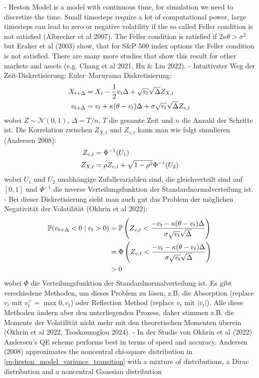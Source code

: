 - Heston Model is a model with continuous time, for simulation we need to discretize the time. Small timesteps require a lot of computational power, large timesteps can lead to zero or negative volatility if the so called Feller condition is not satisfied (Albrecher et al 2007). The Feller condition is satisfied if $2\kappa\theta > \sigma^2$ but Eraker et al (2003) show, that for S&P 500 index options the Feller condition is not satisfied. There are many more studies that show this result for other markets and assets (e.g. Chang et al 2021, Hu & Liu 2022).
- Intuitivster Weg der Zeit-Diskretisierung: Euler–Maruyama Diskretisierung:
\begin{align}
    X_{t+\Delta} &= X_t - \frac{1}{2}v_t\Delta + \sqrt{v_t}\sqrt{\Delta}Z_{X,t} \notag \\
    v_{t+\Delta} &= v_t + \kappa(\theta - v_t)\Delta + \sigma\sqrt{v_t}\sqrt{\Delta}Z_{v,t} \notag
\end{align}
wobei $Z\sim\mathcal{N}(0,1)$, $\Delta = T/n$, $T$ die gesamte Zeit und $n$ die Anzahl der Schritte ist. Die Korrelation zwischen $Z_{X,t}$ und $Z_{v,t}$ kann man wie folgt simulieren (Andersen 2008): %
\begin{align}
    Z_{v,t} &= \Phi^{-1}(U_1) \notag \\
    Z_{X,t} &= \rho Z_{v,t} + \sqrt{1-\rho^2}\Phi^{-1}(U_2) \notag
\end{align}
wobei $U_1$ und $U_2$ unabhängige Zufallsvariablen sind, die gleichverteilt sind auf $[0,1]$ und $\Phi^{-1}$ die inverse Verteilungsfunktion der Standardnormalverteilung ist.
- Bei dieser Diskretisierung sieht man auch gut das Problem der möglichen Negativität der Volatilität (Okhrin et al 2022):
\begin{align}
    \mathbb{P}(v_{t+\Delta}<0 \mid v_t>0) &= \mathbb{P}\left(Z_{v,t} < \frac{-v_t-\kappa(\theta-v_t)\Delta}{\sigma\sqrt{v_t}\sqrt{\Delta}}\right) \notag \\
    &= \Phi\left(Z_{v,t} < \frac{-v_t-\kappa(\theta-v_t)\Delta}{\sigma\sqrt{v_t}\sqrt{\Delta}}\right) \notag \\
    &> 0 \notag
\end{align}
wobei $\Phi$ die Verteilungsfunktion der Standardnormalverteilung ist. Es gibt verschiedene Methoden, um dieses Problem zu lösen, z.B. die Absorption (replace $v_t$ mit $v_t^+ = \max{0, v_t}$) oder Reflection Method (replace $v_t$ mit $\vert v_t\vert$). Alle diese Methoden ändern aber den unterliegenden Prozess, daher stimmen z.B. die Momente der Volatilität nicht mehr mit den theoretischen Momenten überein (Okhrin et al 2022, Tsoskounoglou 2024). 
- In der Studie von Okhrin et al (2022) Andersen's QE scheme performs best in terms of speed and accuracy. Andersen (2008) approximates the noncentral chi-square distribution in \eqref{eq:heston_model_variance_transition} with a mixture of distributions, a Dirac distribution and a noncentral Gaussian distribution